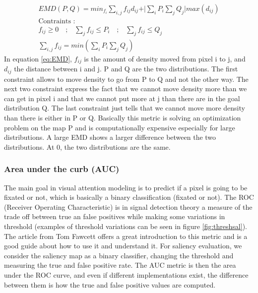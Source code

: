 \begin{equation}  
\begin{aligned}
    EMD(P,Q) = min_{f_i} \sum\limits_{i,j} f_{ij} d_{ij} + \vert\sum\limits_{i} P_i \sum\limits_{j} Q_j \vert  max(d_{ij}) \\
    \textrm{Contraints : }\\
    f_{ij}  \geqslant 0 \quad \textrm{;} \quad  \sum\limits_{j} f_{ij} \leqslant P_i \quad \textrm{;} \quad \sum\limits_{j} f_{ij} \leqslant Q_j\\  \sum\limits_{i,j} f_{ij} = min(\sum\limits_{i} P_i \sum\limits_{j} Q_j)
\end{aligned}
\label{eq:EMD}
\end{equation}
In equation \ref{eq:EMD}, $f_{ij}$ is the amount of density moved from pixel i to j, and $d_{ij}$ the distance between i and j. P and Q are the two distributions. The first constraint allows to move density to go from P to Q and not the other way. The  next two constraint  express the fact that we cannot move density more than we can get in pixel i and that we cannot put more at j than there are in the goal distribution Q. The last constraint just tells that we cannot move more density than there is either in P or Q. Basically this metric is solving an optimization problem on the map P and is computationally expensive especially for large distributions. A large EMD shows a larger difference between the two distributions. At 0, the two distributions are the same. 

\subsubsection{Area under the curb (AUC)}
The main goal in visual attention modeling is to predict if a pixel is going to be fixated or not, which is basically a binary classification (fixated or not). The ROC (Receiver Operating Characteristic) is in signal detection theory a measure of the trade off between true an false positives while making some variations in threshold (examples of threshold variations can be seen in figure \ref{fig:threshsal}). The article from Tom Fawcett \cite{FAWCETT2006861} offers a great introduction to this metric and is a good guide about how to use it and understand it. 
For saliency evaluation, we consider the saliency map as a binary classifier, changing the threshold and measuring the true and false positive rate. The AUC metric is then the area under the ROC curve, and even if different implementations exist, the difference between them is how the true and false positive values are computed.\\


